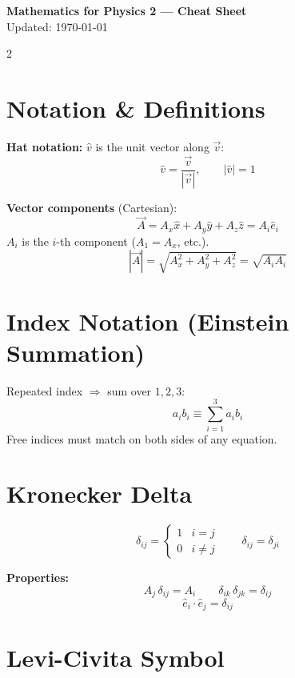 \documentclass[9pt,a4paper]{article}
\begin{document}
\begin{center}
  {\normalsize \textbf{Mathematics for Physics 2 --- Cheat Sheet}} \\[1pt]
  {\tiny Updated: \today}
\end{center}

\begin{multicols}{2}

\section{Notation \& Definitions}

\textbf{Hat notation:} $\hat{v}$ is the unit vector along $\vec{v}$:
\[
  \hat{v} = \frac{\vec{v}}{|\vec{v}|}, \qquad |\hat{v}| = 1
\]

\textbf{Vector components} (Cartesian):
\[
  \vec{A} = A_x\hat{x} + A_y\hat{y} + A_z\hat{z} = A_i\hat{e}_i
\]
$A_i$ is the $i$-th component ($A_1=A_x$, etc.).
\[
  |\vec{A}| = \sqrt{A_x^2+A_y^2+A_z^2} = \sqrt{A_iA_i}
\]

\section{Index Notation (Einstein Summation)}

Repeated index $\Rightarrow$ sum over $1,2,3$:
\[
  a_ib_i \equiv \sum_{i=1}^{3}a_ib_i
\]
Free indices must match on both sides of any equation.

\section{Kronecker Delta}

\[
  \delta_{ij} = \begin{cases} 1 & i=j \\ 0 & i\neq j \end{cases}
  \qquad \delta_{ij}=\delta_{ji}
\]

\textbf{Properties:}
\[
  A_j\,\delta_{ij} = A_i \qquad \delta_{ik}\,\delta_{jk} = \delta_{ij}
\]
\[
  \hat{e}_i\cdot\hat{e}_j = \delta_{ij}
\]

\section{Levi-Civita Symbol}


\end{multicols}
\end{document}
